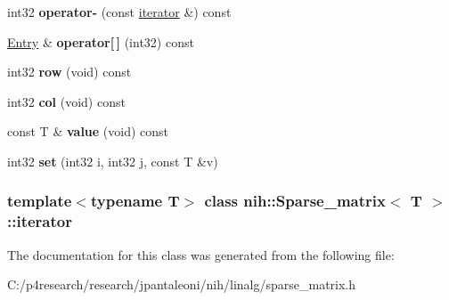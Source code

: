 \begin{DoxyCompactItemize}
\item 
\hypertarget{classnih_1_1_sparse__matrix_1_1iterator_a0dcd3f6306353cfdf72c4e2394d2ce9b}{
int32 {\bfseries operator-\/} (const \hyperlink{classnih_1_1_sparse__matrix_1_1iterator}{iterator} \&) const }
\label{classnih_1_1_sparse__matrix_1_1iterator_a0dcd3f6306353cfdf72c4e2394d2ce9b}

\item 
\hypertarget{classnih_1_1_sparse__matrix_1_1iterator_a5da3aa1c432665b048e1c7ec8e12fc22}{
\hyperlink{structnih_1_1_sparse__matrix__entry}{\-Entry} \& {\bfseries operator\mbox{[}$\,$\mbox{]}} (int32) const }
\label{classnih_1_1_sparse__matrix_1_1iterator_a5da3aa1c432665b048e1c7ec8e12fc22}

\item 
\hypertarget{classnih_1_1_sparse__matrix_1_1iterator_a4b11d7b9e726f80d1f4fb1db4a4de9bb}{
int32 {\bfseries row} (void) const }
\label{classnih_1_1_sparse__matrix_1_1iterator_a4b11d7b9e726f80d1f4fb1db4a4de9bb}

\item 
\hypertarget{classnih_1_1_sparse__matrix_1_1iterator_a27db50037e52134c1b1d02cfb80afa39}{
int32 {\bfseries col} (void) const }
\label{classnih_1_1_sparse__matrix_1_1iterator_a27db50037e52134c1b1d02cfb80afa39}

\item 
\hypertarget{classnih_1_1_sparse__matrix_1_1iterator_a302cc332c016d6152b655c1fd101b44e}{
const \-T \& {\bfseries value} (void) const }
\label{classnih_1_1_sparse__matrix_1_1iterator_a302cc332c016d6152b655c1fd101b44e}

\item 
\hypertarget{classnih_1_1_sparse__matrix_1_1iterator_aff9573647f36d4576dafd84297d5278e}{
int32 {\bfseries set} (int32 i, int32 j, const \-T \&v)}
\label{classnih_1_1_sparse__matrix_1_1iterator_aff9573647f36d4576dafd84297d5278e}

\end{DoxyCompactItemize}
\subsubsection*{template$<$typename \-T$>$ class nih\-::\-Sparse\-\_\-matrix$<$ T $>$\-::iterator}



\-The documentation for this class was generated from the following file\-:\begin{DoxyCompactItemize}
\item 
\-C\-:/p4research/research/jpantaleoni/nih/linalg/sparse\-\_\-matrix.\-h\end{DoxyCompactItemize}
